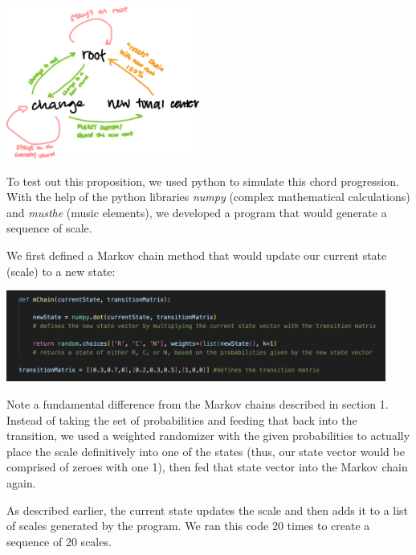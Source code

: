 \documentclass{article}
\begin{document}
\begin{center}
    \includegraphics[height=5cm]{diagram}
    \hspace{4em}
\end{center}

To test out this proposition, we used python to simulate this chord progression. With the help of the python libraries \textit{numpy} (complex mathematical calculations) and \textit{musthe} (music elements), we developed a program that would generate a sequence of scale. 

We first defined a Markov chain method that would update our current state (scale) to a new state:

\begin{center}
    \includegraphics[height=3cm]{mchain}
\end{center}

Note a fundamental difference from the Markov chains described in section 1. Instead of taking the set of probabilities and feeding that back into the transition, we used a weighted randomizer with the given probabilities to actually place the scale definitively into one of the states (thus, our state vector would be comprised of zeroes with one 1), then fed that state vector into the Markov chain again. 

As described earlier, the current state updates the scale and then adds it to a list of scales generated by the program. We ran this code 20 times to create a sequence of 20 scales. 
\end{document}
